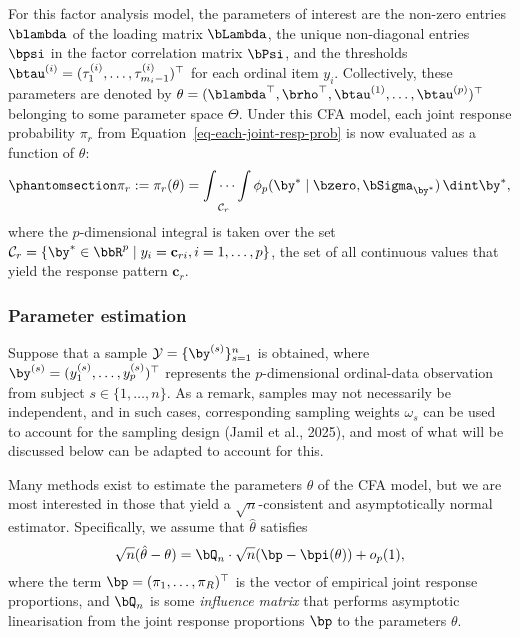 \documentclass[
  letterpaper,
  DIV=11,
  numbers=noendperiod]{scrartcl}
\begin{document}
For this factor analysis model, the parameters of interest are the
non-zero entries \(\blambda\) of the loading matrix \(\bLambda\), the
unique non-diagonal entries \(\bpsi\) in the factor correlation matrix
\(\bPsi\), and the thresholds
\(\btau^{(i)} = (\tau_1^{(i)},\dots,\tau_{m_i-1}^{(i)})^\top\) for each
ordinal item \(y_i\). Collectively, these parameters are denoted by
\(\theta = (\blambda^\top,\brho^\top,\btau^{(1)},\dots,\btau^{(p)})^\top\)
belonging to some parameter space \(\Theta\). Under this CFA model, each
joint response probability \(\pi_r\) from
Equation~\ref{eq-each-joint-resp-prob} is now evaluated as a function of
\(\theta\):
\begin{equation}\phantomsection\label{eq-joint-resp-prob-integral}{
\pi_r := \pi_r(\theta) = \idotsint \limits_{\mathcal C_r} \phi_p(\by^* \mid \bzero,\bSigma_{\by^*}) \, \dint\by^*,
}\end{equation} where the \(p\)-dimensional integral is taken over the
set
\(\mathcal C_r = \{ \by^* \in \bbR^p \mid y_i = \mathbf c_{ri}, i=1,\dots,p\}\),
the set of all continuous values that yield the response pattern
\(\mathbf c_r\).

\subsubsection{Parameter estimation}\label{parameter-estimation}

Suppose that a sample \(\mathcal Y = \{\by^{(s)}\}_{s=1}^n\) is
obtained, where \(\by^{(s)} = (y_1^{(s)},\ldots,y_p^{(s)})^\top\)
represents the \(p\)-dimensional ordinal-data observation from subject
\(s\in\{1,\dots,n\}\). As a remark, samples may not necessarily be
independent, and in such cases, corresponding sampling weights
\(\omega_s\) can be used to account for the sampling design (Jamil et
al., 2025), and most of what will be discussed below can be adapted to
account for this.

Many methods exist to estimate the parameters \(\theta\) of the CFA
model, but we are most interested in those that yield a
\(\sqrt{n}\)-consistent and asymptotically normal estimator.
Specifically, we assume that \(\hat\theta\) satisfies \[
\sqrt{n}(\hat\theta - \theta) = \bQ_n \cdot \sqrt{n}(\bp - \bpi(\theta)) + o_p(1),
\] where the term \(\bp = (\pi_1,\ldots,\pi_R)^\top\) is the vector of
empirical joint response proportions, and \(\bQ_n\) is some
\emph{influence matrix} that performs asymptotic linearisation from the
joint response proportions \(\bp\) to the parameters \(\theta\).
\end{document}
